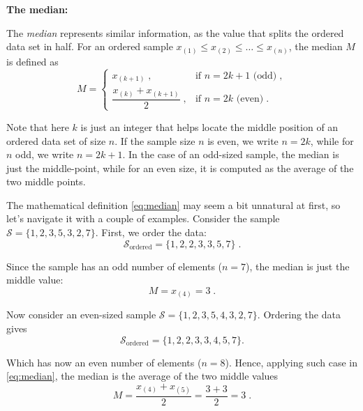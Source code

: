 \medskip

\textbf{The median:}

\medskip

The \textit{median} represents similar information, as the value that splits the ordered data set in half. For an ordered sample $x_{(1)} \le x_{(2)} \le \dots \le x_{(n)}$, the median $M$ is defined as
\begin{equation}
	M = \begin{cases} 
		x_{(k+1)} \; , & \text{if } n = 2k+1 \text{ (odd)} \; , \\[2mm]
		\dfrac{x_{(k)} + x_{(k+1)}}{2} \; , & \text{if } n = 2k \text{ (even)} \; .
	\end{cases}
	\label{eq:median}
\end{equation}

Note that here $k$ is just an integer that helps locate the middle position of an ordered data set of size $n$. If the sample size $n$ is even, we write $n = 2k$, while for $n$ odd, we write $n = 2k + 1$. In the case of an odd-sized sample, the median is just the middle-point, while for an even size, it is computed as the average of the two middle points.

\medskip 

The mathematical definition \eqref{eq:median} may seem a bit unnatural at first, so let's navigate it with a couple of examples. Consider the sample $\mathcal{S} = \{1, 2, 3, 5, 3, 2, 7\}$. First, we order the data: 
\begin{equation}
	\mathcal{S}_{\text{ordered}} = \{1, 2, 2, 3, 3, 5, 7\} \; . \nonumber
\end{equation}

Since the sample has an odd number of elements ($n = 7$), the median is just the middle value: 
\begin{equation}
	M = x_{(4)} = 3 \; . \nonumber
\end{equation}

Now consider an even-sized sample $\mathcal{S} = \{1, 2, 3, 5, 4, 3, 2, 7\}$. Ordering the data gives 
\begin{equation}
	\mathcal{S}_{\text{ordered}} = \{1, 2, 2, 3, 3, 4, 5, 7\}. \nonumber
\end{equation}

Which has now an even number of elements ($n = 8$). Hence, applying such case in \eqref{eq:median}, the median is the average of the two middle values
\begin{equation}
	M = \frac{x_{(4)} + x_{(5)}}{2} = \frac{3 + 3}{2} = 3 \; . \nonumber
\end{equation}

